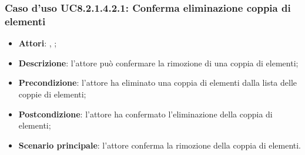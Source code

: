 		\subsubsection{Caso d'uso UC8.2.1.4.2.1: Conferma eliminazione coppia di elementi}
		\label{UC8.2.1.4.2.1}
		\begin{itemize}
			\item \textbf{Attori}: \uau, \uaupro;
			\item \textbf{Descrizione}: l'attore può confermare la rimozione di una coppia di elementi;
			\item \textbf{Precondizione}: l'attore ha eliminato una coppia di elementi dalla lista delle coppie di elementi;
			\item \textbf{Postcondizione}: l'attore ha confermato l'eliminazione della coppia di elementi;
			\item \textbf{Scenario principale}: l'attore conferma la rimozione della coppia di elementi.
		\end{itemize}

